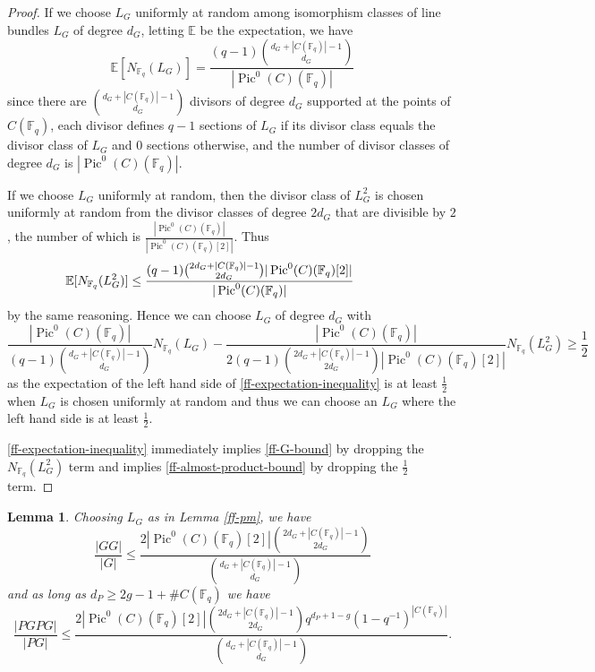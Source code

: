 \documentclass{amsart}
\numberwithin{equation}{section}
\newtheorem{lemma}[theorem]{Lemma}
\begin{document}
\begin{proof} If we choose $L_G$ uniformly at random among isomorphism classes of line bundles $L_G$ of degree $d_G$, letting $\mathbb E$ be the expectation, we have \[ \mathbb E[ N_{\mathbb F_q}(L_G)] =\frac{ (q-1)   \binom{d_G + |C(\mathbb F_q)|-1}{d_G}}{ |\operatorname{Pic}^0(C)(\mathbb F_q)|}\] since there are $ \binom{d_G + |C(\mathbb F_q)|-1}{d_G}$ divisors of degree $d_G$ supported at the points of $C(\mathbb F_q)$, each divisor defines $q-1$ sections of $L_G$ if its divisor class equals the divisor class of $L_G$ and $0$ sections otherwise, and the number of divisor classes of degree $d_G$ is $|\operatorname{Pic}^0(C)(\mathbb F_q)|$.

If we choose $L_G$ uniformly at random, then the divisor class of $L_G^{2}$ is chosen uniformly at random from the divisor classes of degree $2d_G$ that are divisible by $2$, the number of which is $\frac{| \operatorname{Pic}^0(C)(\mathbb F_q)|}{|\operatorname{Pic}^0(C)(\mathbb F_q)[2]|}$. Thus \[ \hspace{-.5in} \mathbb E[ N_{\mathbb F_q}(L_G^2) ] \leq \frac{ (q-1)   \binom{2d_G + |C(\mathbb F_q)|-1}{2d_G} |\operatorname{Pic}^0(C)(\mathbb F_q)[2]| }{ |\operatorname{Pic}^0(C)(\mathbb F_q)|}\] by the same reasoning. Hence we can choose $L_G$ of degree $d_G$ with 
\begin{equation}\label{ff-expectation-inequality} \frac{ |\operatorname{Pic}^0(C)(\mathbb F_q)|}{ (q-1)   \binom{d_G + |C(\mathbb F_q)|-1}{d_G}}N_{\mathbb F_q}(L_G) - \frac{ |\operatorname{Pic}^0(C)(\mathbb F_q)|}{2 (q-1)   \binom{2d_G + |C(\mathbb F_q)|-1}{2d_G} |\operatorname{Pic}^0(C)(\mathbb F_q)[2]| }N_{\mathbb F_q}(L_G^2) \geq \frac{1}{2} \end{equation}
as the expectation of the left hand side of \eqref{ff-expectation-inequality} is at least $\frac{1}{2}$ when $L_G$ is chosen uniformly at random and thus we can choose an $L_G$ where the left hand side is at least $\frac{1}{2}$.

\eqref{ff-expectation-inequality} immediately implies \eqref{ff-G-bound} by dropping the $N_{\mathbb F_q}(L_G^2)$ term and implies \eqref{ff-almost-product-bound} by dropping the $\frac{1}{2}$ term.\end{proof}


\begin{lemma} \label{ff-product} Choosing $L_G$ as in Lemma \ref{ff-pm}, we have
\begin{equation}\label{ff-G-product-bound} \frac{ |GG|}{|G|} \leq \frac{ 2 |\operatorname{Pic}^0(C)(\mathbb F_q)[2]| \binom{2d_G + |C(\mathbb F_q)|-1}{2d_G}}{ \binom{d_G + |C(\mathbb F_q)|-1}{d_G}}\end{equation}
and as long as $d_P \geq 2g-1 +\# C(\mathbb F_q)$ we have
\begin{equation}\label{ff-product-bound} \frac{|PGPG|}{|PG|}\leq \frac{ 2 |\operatorname{Pic}^0(C)(\mathbb F_q)[2]| \binom{2d_G + |C(\mathbb F_q)|-1}{2d_G} q^{ d_P + 1-g} (1-q^{-1})^{|C(\mathbb F_q)|}}{ \binom{d_G + |C(\mathbb F_q)|-1}{d_G}}.\end{equation} 
\end{lemma}
\end{document}
